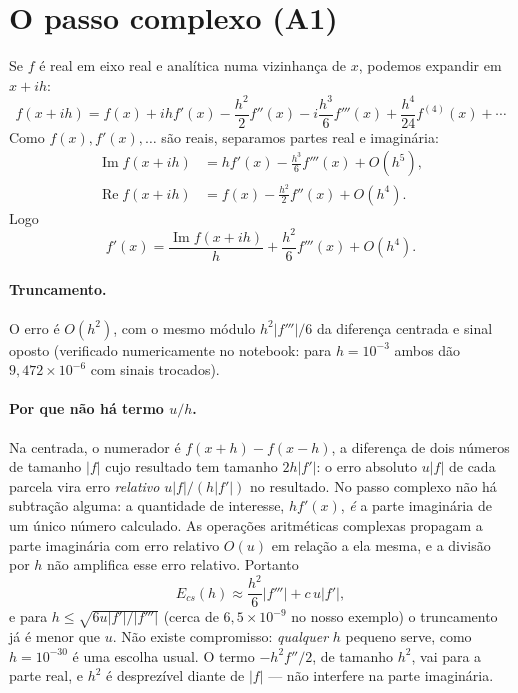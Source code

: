 \documentclass[11pt,a4paper]{article}
\renewcommand{\Im}{\operatorname{Im}}
\renewcommand{\Re}{\operatorname{Re}}
\begin{document}
\section{O passo complexo (A1)}
\label{sec:cs}

Se $f$ é real em eixo real e analítica numa vizinhança de $x$, podemos expandir em $x+ih$:
\begin{equation}
f(x+ih) = f(x) + ihf'(x) - \frac{h^2}{2}f''(x) - i\frac{h^3}{6}f'''(x) + \frac{h^4}{24}f^{(4)}(x) + \cdots
\label{eq:taylor-complexo}
\end{equation}
Como $f(x), f'(x),\dots$ são reais, separamos partes real e imaginária:
\begin{align}
\Im f(x+ih) &= hf'(x) - \frac{h^3}{6}f'''(x) + O(h^5), \\
\Re f(x+ih) &= f(x) - \frac{h^2}{2}f''(x) + O(h^4). \label{eq:parte-real}
\end{align}
Logo
\begin{equation}
\boxed{\;f'(x) = \frac{\Im f(x+ih)}{h} + \frac{h^2}{6}f'''(x) + O(h^4).\;}
\end{equation}

\paragraph{Truncamento.} O erro é $O(h^2)$, com o mesmo módulo $h^2|f'''|/6$ da diferença centrada e sinal oposto (verificado numericamente no notebook: para $h=10^{-3}$ ambos dão $9{,}472\times10^{-6}$ com sinais trocados).

\paragraph{Por que não há termo $u/h$.} Na centrada, o numerador é $f(x+h)-f(x-h)$, a diferença de dois números de tamanho $|f|$ cujo resultado tem tamanho $2h|f'|$: o erro absoluto $u|f|$ de cada parcela vira erro \emph{relativo} $u|f|/(h|f'|)$ no resultado. No passo complexo não há subtração alguma: a quantidade de interesse, $hf'(x)$, \emph{é} a parte imaginária de um único número calculado. As operações aritméticas complexas propagam a parte imaginária com erro relativo $O(u)$ em relação a ela mesma, e a divisão por $h$ não amplifica esse erro relativo. Portanto
\begin{equation}
E_{cs}(h) \approx \frac{h^2}{6}|f'''| + c\,u|f'| ,
\end{equation}
e para $h\le\sqrt{6u|f'|/|f'''|}$ (cerca de $6{,}5\times10^{-9}$ no nosso exemplo) o truncamento já é menor que $u$. Não existe compromisso: \emph{qualquer} $h$ pequeno serve, como $h=10^{-30}$ é uma escolha usual. O termo $-h^2f''/2$, de tamanho $h^2$, vai para a parte real, e $h^2$ é desprezível diante de $|f|$ --- não interfere na parte imaginária.
\end{document}

